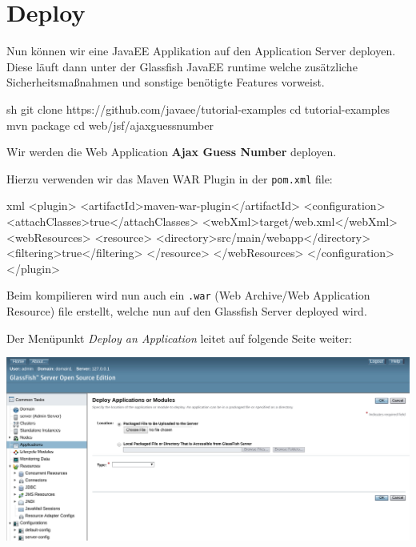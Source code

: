 \clearpage

\section{Deploy}

Nun können wir eine JavaEE Applikation auf den Application Server deployen. Diese läuft dann unter der Glassfish JavaEE runtime welche zusätzliche Sicherheitsmaßnahmen und sonstige benötigte Features vorweist.

\begin{code}{sh}
    git clone https://github.com/javaee/tutorial-examples
    cd tutorial-examples
    mvn package
    cd web/jsf/ajaxguessnumber
\end{code}

Wir werden die Web Application \textbf{Ajax Guess Number} deployen.

Hierzu verwenden wir das Maven WAR Plugin in der \texttt{pom.xml} file:

\begin{code}{xml}
    <plugin>
        <artifactId>maven-war-plugin</artifactId>
        <configuration>
            <attachClasses>true</attachClasses>
            <webXml>target/web.xml</webXml>
            <webResources>
                <resource>
                    <directory>src/main/webapp</directory>
                    <filtering>true</filtering>
                </resource>
            </webResources>
        </configuration>
    </plugin>
\end{code}

Beim kompilieren wird nun auch ein \texttt{.war} (Web Archive/Web Application Resource) file erstellt, welche nun auf den Glassfish Server deployed wird.

Der Menüpunkt \textit{Deploy an Application} leitet auf folgende Seite weiter:

\includegraphics[width=\textwidth]{images/glassfish-deploy}

